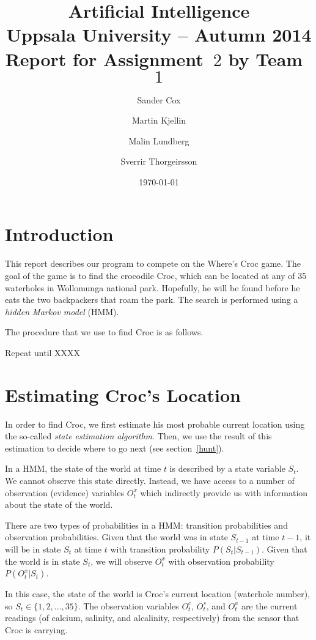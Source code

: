 \documentclass[a4paper]{article}
\title{\textbf{Artificial Intelligence \\
    Uppsala University -- Autumn 2014 \\
    Report for Assignment~$2$
    by Team~$1$
  }
}
\author{Sander Cox \and Martin Kjellin \and Malin Lundberg \and Sverrir
  Thorgeirsson}
\date{\today}
\begin{document}
\maketitle

\section{Introduction}

This report describes our program to compete
on the Where's Croc game. The goal of the game is to find the crocodile Croc,
which can be located at any of 35 waterholes in Wollomunga national
park. Hopefully, he will be found before he eats the two backpackers that roam
the park. The search is performed using a \emph{hidden Markov model} (HMM).

The procedure that we use to find Croc is as follows.

Repeat until XXXX





\section{Estimating Croc's Location}

In order to find Croc, we first estimate his most probable current
location using the so-called \emph{state estimation algorithm}. Then, we use
the result of this estimation to decide where to go next (see section~\ref{hunt}).

In a HMM, the state of the world at time $t$ is
described by a state variable $S_t$. We cannot observe this state
directly. Instead, we have access to a number of observation (evidence)
variables $O^x_t$ which indirectly provide us with information about the state
of the world.

There are two types of probabilities in a HMM: transition probabilities and
observation probabilities. %
Given that the world was in state $S_{t-1}$ at time $t-1$, it
will be in state $S_t$ at time $t$ with transition probability
$P(S_t|S_{t-1})$. Given that the world is in state $S_t$, we will observe
$O^x_t$ with observation probability $P(O^x_t|S_t)$.

In this case, the state of the world is Croc's current location (waterhole
number), so $S_t \in \{1, 2, \dots, 35\}$. %
The observation variables $O^c_t$, $O^s_t$, and $O^a_t$ are the current
readings (of calcium, salinity, and alcalinity, respectively) from the sensor
that Croc is carrying.
\end{document}
